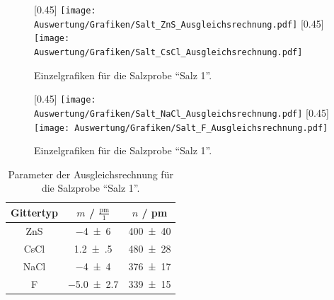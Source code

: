 \begin{figure}[h!]
  \centering
  [0.45\textwidth]{
  \centering
  \texttt{[image: Auswertung/Grafiken/Salt\_ZnS\_Ausgleichsrechnung.pdf]}
  }
  [0.45\textwidth]{
  \centering
  \texttt{[image: Auswertung/Grafiken/Salt\_CsCl\_Ausgleichsrechnung.pdf]}
  }\\
  \label{Abb:Salz_Plotsa}
  \caption{Einzelgrafiken für die Salzprobe \enquote{Salz 1}.}
\end{figure}

\begin{figure}[h!]
  \centering
  [0.45\textwidth]{
  \centering
  \texttt{[image: Auswertung/Grafiken/Salt\_NaCl\_Ausgleichsrechnung.pdf]}
  }
  [0.45\textwidth]{
  \centering
  \texttt{[image: Auswertung/Grafiken/Salt\_F\_Ausgleichsrechnung.pdf]}
  }\\
  \label{Abb:Salz_Plotsn}
  \caption{Einzelgrafiken für die Salzprobe \enquote{Salz 1}.}
\end{figure}

\begin{table}[H]
  \centering
  \caption{Parameter der Ausgleichsrechnung für die Salzprobe \enquote{Salz 1}.}
  \label{Tab:Salz_Regression}
  \begin{tabular}{c | c c }
    \toprule
    Gittertyp &
    $m$ / $\frac{\mathrm{pm}}{1}$ &
    $n$ / pm \\
    \midrule
    ZnS & \num{-4(6)} & \num{400(40)} \\
    CsCl & \num{1.2(5)} & \num{480(28)} \\
    NaCl & \num{-4(4)} & \num{376(17)} \\
    F & \num{-5.0(27)} & \num{339(15)} \\
    \bottomrule
  \end{tabular}
\end{table}

